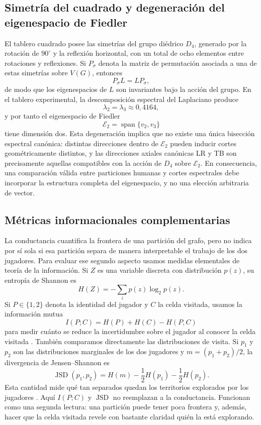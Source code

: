 \documentclass[journal]{IEEEtran}
\newcommand{\Etwo}{\mathcal{E}_2}
\begin{document}
\subsection{Simetría del cuadrado y degeneración del eigenespacio de Fiedler}

El tablero cuadrado posee las simetrías del grupo diédrico $D_4$, generado por la rotación de $90^\circ$ y la reflexión horizontal, con un total de ocho elementos entre rotaciones y reflexiones. Si $P_\sigma$ denota la matriz de permutación asociada a una de estas simetrías sobre $V(G)$, entonces
\[
P_\sigma L = L P_\sigma,
\]
de modo que los eigenespacios de $L$ son invariantes bajo la acción del grupo. En el tablero experimental, la descomposición espectral del Laplaciano produce
\[
\lambda_2 = \lambda_3 \approx 0{,}4164,
\]
y por tanto el eigenespacio de Fiedler
\[
\Etwo = \operatorname{span}\{v_2, v_3\}
\]
tiene dimensión dos. Esta degeneración implica que no existe una única bisección espectral canónica: distintas direcciones dentro de $\Etwo$ pueden inducir cortes geométricamente distintos, y las direcciones axiales canónicas LR y TB son precisamente aquellas compatibles con la acción de $D_4$ sobre $\Etwo$. En consecuencia, una comparación válida entre particiones humanas y cortes espectrales debe incorporar la estructura completa del eigenespacio, y no una elección arbitraria de vector.

\subsection{Métricas informacionales complementarias}

La conductancia cuantifica la frontera de una partición del grafo, pero no indica por sí sola si esa partición separa de manera interpretable el trabajo de los dos jugadores. Para evaluar ese segundo aspecto usamos medidas elementales de teoría de la información. Si $Z$ es una variable discreta con distribución $p(z)$, su entropía de Shannon es
\begin{equation}
H(Z) = - \sum_z p(z)\log_2 p(z).
\label{eq:entropy}
\end{equation}
Si $P \in \{1,2\}$ denota la identidad del jugador y $C$ la celda visitada, usamos la información mutua
\begin{equation}
I(P;C) = H(P) + H(C) - H(P,C)
\label{eq:mutual-information}
\end{equation}
para medir cuánto se reduce la incertidumbre sobre el jugador al conocer la celda visitada \cite{cover2006}. También comparamos directamente las distribuciones de visita. Si $p_1$ y $p_2$ son las distribuciones marginales de los dos jugadores y $m=(p_1+p_2)/2$, la divergencia de Jensen--Shannon es
\begin{equation}
\operatorname{JSD}(p_1,p_2)
= H(m) - \frac{1}{2}H(p_1) - \frac{1}{2}H(p_2).
\label{eq:jsd}
\end{equation}
Esta cantidad mide qué tan separados quedan los territorios explorados por los jugadores \cite{lin1991}. Aquí $I(P;C)$ y $\operatorname{JSD}$ no reemplazan a la conductancia. Funcionan como una segunda lectura: una partición puede tener poca frontera y, además, hacer que la celda visitada revele con bastante claridad quién la está explorando.
\end{document}
